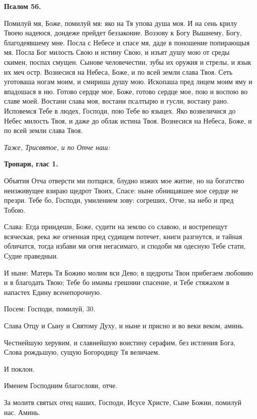 \medskip


\bfseries Псалом 56.\normalfont{}\nopagebreak


Помилуй мя, Боже, помилуй мя: яко на Тя упова душа моя. И на сень крилу Твоею надеюся, дондеже прейдет беззаконие. Воззову к Богу Вышнему, Богу, благодеявшему мне. Посла с Небесе и спасе мя, даде в поношение попирающыя мя. Посла Бог милость Свою и истину Свою, и изъят душу мою от среды скимен, поспах смущен. Сынове человечестии, зубы их оружия и стрелы, и язык их меч остр. Вознесися на Небеса, Боже, и по всей земли слава Твоя. Сеть уготоваша ногам моим, и смириша душу мою. Ископаша пред лицем моим яму и впадошася в ню. Готово сердце мое, Боже, готово сердце мое, пою и воспою во славе моей. Востани слава моя, востани псалтырю и гусли, востану рано. Исповемся Тебе в людех, Господи, пою Тебе во языцех. Яко возвеличися до Небес милость Твоя, и даже до облак истина Твоя. Вознесися на Небеса, Боже, и по всей земли слава Твоя.


\itshape Таже, Трисвятое, и по Отче наш:\normalfont{}


\medskip


\bfseries Тропари, глас 1.\normalfont{}\nopagebreak


Объятия Отча отверсти ми потщися, блудно изжих мое житие, но на богатство неизживущее взираю щедрот Твоих, Спасе: ныне обнищавшее мое сердце не презри. Тебе бо, Господи, умилением зову: согреших, Отче, на небо и пред Тобою.


Слава: Егда приидеши, Боже, судити на землю со славою, и вострепещут всяческая, река же огненная пред судищем потечет, книги разгнутся, и тайная обличатся, тогда избави мя огня негасимаго, и сподоби мя одесную Тебе стати, Судие праведныи.


И ныне: Матерь Тя Божию молим вси Дево; в щедроты Твои прибегаем любовию и в благодать Твою; Тебе бо имамы грешнии спасение, и Тебе стяжахом в напастех Едину всенепорочную.


Посем: Господи, помилуй, 30.

Слава Отцу и Сыну и Святому Духу, и ныне и присно и во веки веком, аминь.

Честнейшую херувим, и славнейшую воистину серафим, без истления Бога, Слова рождьшую, сущую Богородицу Тя величаем.

И поклон.

Именем Господним благослови, отче.

За молитв святых отец наших, Господи, Исусе Христе, Сыне Божии, помилуй нас. Аминь.


